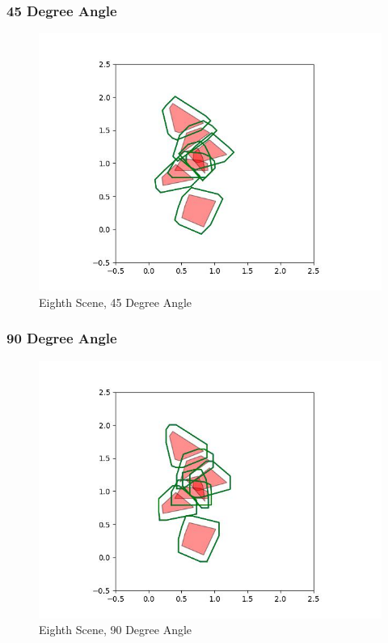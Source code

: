 \documentclass{article}
\begin{document}
\newpage
\subsubsection{45 Degree Angle}
\begin{figure}[h!]
	\includegraphics[width= 0.9 \linewidth]{Problem3_minkowski8_45.jpg}
	\centering
	\caption{Eighth Scene, 45 Degree Angle}
	\label{Problem3_minkowski8_45.jpg}
\end{figure}

\newpage
\subsubsection{90 Degree Angle}
\begin{figure}[h!]
	\includegraphics[width= 0.9 \linewidth]{Problem3_minkowski8_90.jpg}
	\centering
	\caption{Eighth Scene, 90 Degree Angle}
	\label{Problem3_minkowski8_90.jpg}
\end{figure}
\end{document}
